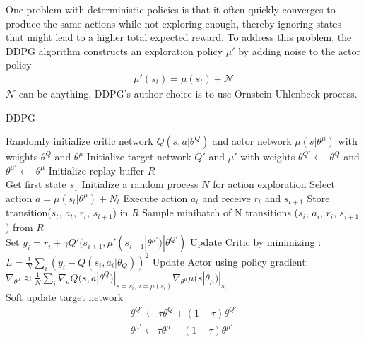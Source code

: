 One problem with deterministic policies is that it often quickly converges to produce the same actions while not exploring enough, thereby ignoring states that might lead to a higher total expected reward. To address this problem, the DDPG algorithm constructs an exploration policy $\mu'$ by adding noise to the actor policy
\begin{align}
\mu'(s_t) = \mu(s_t) + \mathcal{N}
\end{align}
$\mathcal{N}$ can be anything, DDPG's author choice is to use Ornstein-Uhlenbeck process.

\begin{algorithm} 
\caption{DDPG}
\label{alg:cap}
\begin{algorithmic}
\STATE Randomly initialize critic network $Q(s, a|\theta^{Q})$ and actor network $\mu(s|\theta^{\mu})$ with weights $\theta^{Q}$ and $\theta^{\mu}$
\STATE Initialize target network $Q'$ and $\mu'$ with weights $\theta^{Q'}$$\leftarrow$ $\theta^{Q}$ and $\theta^{\mu'}$$\leftarrow$ $\theta^{\mu}$
\STATE Initialize replay buffer $R$\\
    \STATE Get first state $s_1$
    \STATE Initialize a random process $N$ for action exploration
        \STATE Select action $a = \mu(s_t|\theta^{\mu}) + N_t$
        \STATE Execute action $a_t$ and receive $r_t$ and $s_{t+1}$
        \STATE Store transition($s_t$, $a_t$, $r_t$, $s_{t+1}$)
        in $R$
        \STATE Sample minibatch of N transitions ($s_i$, $a_i$, $r_i$, $s_{i+1}$) 
        \STATE from $R$ \\
        \STATE Set $y_i = r_i + \gamma Q'(s_{i+1},\mu'(s_{i+1}|\theta^{\mu'})|\theta^{Q'})$
        \STATE Update Critic by minimizing : 
        \STATE \  $L = \frac{1}{N} \sum_i(y_i - Q(s_i,a_i|\theta_Q))^2 $
        \STATE Update Actor using policy gradient:
        \STATE $\nabla_{\theta^{\mu}} \approx \frac{1}{N} \sum_i \nabla_a Q(s,a|\theta^Q)|_{s=s_i,a=\mu(s_i)}\nabla_{\theta^\mu}\mu(s|\theta_\mu)|_{s_i}$
        \\
        \STATE Soft update target network
        \begin{align*}
            \theta^{Q'} \leftarrow \tau\theta^{Q}+ (1-\tau)\theta^{Q'} \\ 
            \theta^{\mu'} \leftarrow \tau\theta^{\mu}+ (1-\tau)\theta^{\mu'}
        \end{align*}
    \ENDFOR
\ENDFOR
\end{algorithmic}
\end{algorithm}

